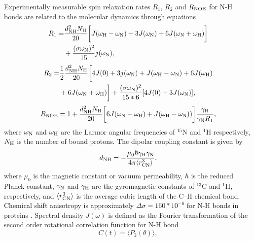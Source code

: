 \documentclass[pre,aps,floatfix,authordate1-4]{revtex4-1}
\begin{document}
Experimentally measurable spin relaxation rates $R_1$, $R_2$ and $R_{\rm NOE}$ for N-H bonds
are related to the molecular dynamics through equations \cite{abragam,kay89}
\begin{equation}\label{R1}
  \begin{aligned}
  R_{1}= & \frac{d_{\rm{NH}}^2N_{\rm{H}}}{20}\bigg[J(\omega_{\rm{H}}-\omega_{\rm{N}})+3J(\omega_{\rm{N}})+6J(\omega_{\rm{N}}+\omega_{\rm{H}})\bigg] \\
        & +\frac{(\sigma \omega_{\rm{N}})^2}{15}j(\omega_{\rm{N}}),
  \end{aligned}
\end{equation}
\begin{equation}\label{R2}
    \begin{aligned}
  R_{2}= & \frac{1}{2}\frac{d_{\rm{NH}}^2N_{\rm{H}}}{20}\bigg[4J(0)+3j(\omega_{\rm{N}})+J(\omega_{\rm{H}}-\omega_{\rm{N}})+6J(\omega_{\rm{H}})  \\
    & +6J(\omega_{\rm{N}}+\omega_{\rm{H}})\bigg]+\frac{(\sigma \omega_{\rm{N}})^2}{15*6}[4J(0) +3J(\omega_{\rm{N}})],
    \end{aligned}
\end{equation}
\begin{equation}\label{NOE}
R_{\rm NOE}=1+\frac{d_{\rm{NH}}^2N_{\rm{H}}}{20}\bigg[6J(\omega_{\rm{N}}+\omega_{\rm{H}})+J(\omega_{\rm{H}}-\omega_{\rm{N}}))\bigg]\frac{\gamma_{\rm{H}}}{\gamma_{\rm{N}}R_1},
\end{equation}
where $\omega_{\rm{N}}$ and $\omega_{\rm{H}}$ are the Larmor angular frequencies of $^{15}$N and $^1$H respectively,
$N_{\rm{H}}$ is the number of bound protons. The dipolar coupling constant is given by
\begin{equation}
d_{\rm{NH}}=-\frac{\mu_0\hbar\gamma_{\rm{H}}\gamma_{\rm{N}}}{4\pi\langle r_{\rm{CN}}^3\rangle},\nonumber
\end{equation}
where $\mu_0$ is the magnetic constant or vacuum permeability, $\hbar$ is the reduced Planck constant,
$\gamma_{\rm{N}}$ and $\gamma_{\rm{H}}$ are the gyromagnetic constants of $^{13}$C and $^1$H, respectively,
and $\langle r_{\rm{CN}}^3\rangle$ is the average cubic length of the C--H chemical bond.
Chemical shift anisotropy is approximately $\Delta \sigma=160*10^{-6}$ for N-H bonds in proteins \cite{??}.
Spectral density $J(\omega)$ is defined as the Fourier transformation of the second order
rotational correlation function for N-H bond
\begin{equation}
  C(t)=\langle P_2(\theta) \rangle,
\end{equation}
\end{document}
